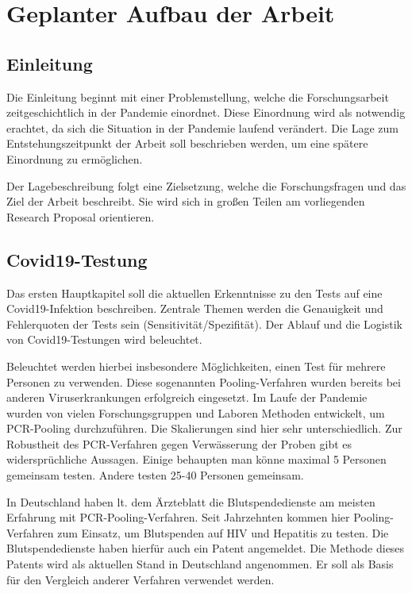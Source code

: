 
\chapter{Geplanter Aufbau der Arbeit}
\section{Einleitung}
Die Einleitung beginnt mit einer Problemstellung, welche die Forschungsarbeit zeitgeschichtlich in der Pandemie einordnet.
Diese Einordnung wird als notwendig erachtet, da sich die Situation in der Pandemie laufend verändert.
Die Lage zum Entstehungszeitpunkt der Arbeit soll beschrieben werden, um eine spätere Einordnung zu ermöglichen.

Der Lagebeschreibung folgt eine Zielsetzung, welche die Forschungsfragen und das Ziel der Arbeit beschreibt.
Sie wird sich in großen Teilen am vorliegenden Research Proposal orientieren.

\section{Covid19-Testung}
Das ersten Hauptkapitel soll die aktuellen Erkenntnisse zu den Tests auf eine Covid19-Infektion beschreiben.
Zentrale Themen werden die Genauigkeit und Fehlerquoten der Tests sein (Sensitivität/Spezifität).
Der Ablauf und die Logistik von Covid19-Testungen wird beleuchtet.

Beleuchtet werden hierbei insbesondere Möglichkeiten, einen Test für mehrere Personen zu verwenden.
Diese sogenannten Pooling-Verfahren wurden bereits bei anderen Viruserkrankungen erfolgreich eingesetzt.
\cite{Ärzteblatt}
Im Laufe der Pandemie wurden von vielen Forschungsgruppen und Laboren Methoden entwickelt, um PCR-Pooling durchzuführen.
Die Skalierungen sind hier sehr unterschiedlich.
Zur Robustheit des PCR-Verfahren gegen Verwässerung der Proben gibt es widersprüchliche Aussagen.
Einige behaupten man könne maximal 5 Personen gemeinsam testen.
\cite{Quelle}
Andere testen 25-40 Personen gemeinsam.
\cite{Quelle}

In Deutschland haben lt. dem Ärzteblatt die Blutspendedienste am meisten Erfahrung mit PCR-Pooling-Verfahren.
\cite{Ärzteblatt}
Seit Jahrzehnten kommen hier Pooling-Verfahren zum Einsatz, um Blutspenden auf HIV und Hepatitis zu testen.
Die Blutspendedienste haben hierfür auch ein Patent angemeldet.
\cite{Patent Blutspende}
Die Methode dieses Patents wird als aktuellen Stand in Deutschland angenommen.
Er soll als Basis für den Vergleich anderer Verfahren verwendet werden.

